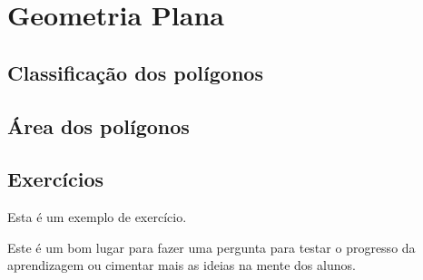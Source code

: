 \chapter{Geometria Plana}
\section{Classificação dos polígonos}
    
\section{Área dos polígonos}
    
\section{Exercícios}
        Esta é um exemplo de exercício.
        \begin{exercise}
        Este é um bom lugar para fazer uma pergunta para testar o progresso da aprendizagem ou cimentar mais as ideias na mente dos alunos.
        \end{exercise} 